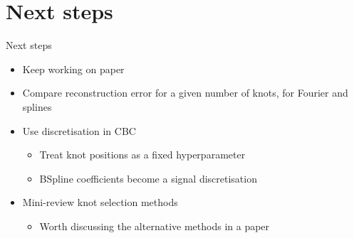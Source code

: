 \documentclass[presentation]{beamer}
\begin{document}
\section{Next steps}
\label{sec:orga9e07c2}
\begin{frame}[label={sec:org6138647}]{Next steps}
\begin{itemize}
\item Keep working on paper
\item Compare reconstruction error for a given number of knots, for Fourier and splines
\item Use discretisation in CBC
\begin{itemize}
\item Treat knot positions as a fixed hyperparameter
\item BSpline coefficients become a signal discretisation
\end{itemize}
\item Mini-review knot selection methods
\begin{itemize}
\item Worth discussing the alternative methods in a paper
\end{itemize}
\end{itemize}
\end{frame}
\end{document}
